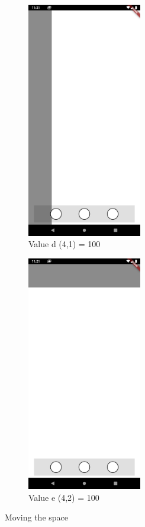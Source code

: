 \begin{figure}[b]
    \begin{subfigure}{0.4\textwidth}
        \centering
        \includegraphics[width=5cm]{Images/App/xmove.png}
        \caption{Value d (4,1) = 100}
        \label{fig:xmove}
    \end{subfigure}
    \hfill
    \begin{subfigure}{0.4\textwidth}
        \centering
        \includegraphics[width=5cm]{Images/App/ymove.png}
        \caption{Value e (4,2) = 100}
        \label{fig:ymove}
    \end{subfigure}
    \caption{Moving the space}
    \label{fig:moving}
\end{figure}

